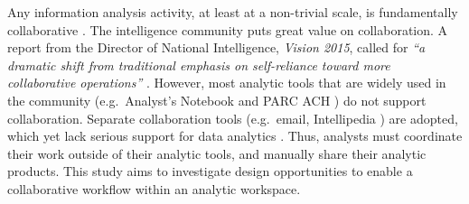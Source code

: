 Any information analysis activity, at least at a non-trivial scale, is
fundamentally collaborative \cite{Convertino2011}. The intelligence community
puts great value on collaboration. A report from the Director of National
Intelligence, \emph{Vision 2015},  called for \emph{``a dramatic shift from
traditional emphasis on self-reliance toward more collaborative operations''}
\cite[p.13]{Vision2015}. However, most analytic tools that are widely used in
the community (e.g.~Analyst's Notebook \cite{IBM} and PARC ACH
\cite{PARC}) do not support collaboration. Separate
collaboration tools (e.g.~email, Intellipedia \cite{Intelink2017}) are adopted, which yet lack
serious support for data analytics \cite{Treverton2016}. Thus,
analysts must coordinate their work outside of their analytic tools, and manually
share their analytic products. This study aims to investigate design opportunities to enable a collaborative workflow within an analytic workspace.



